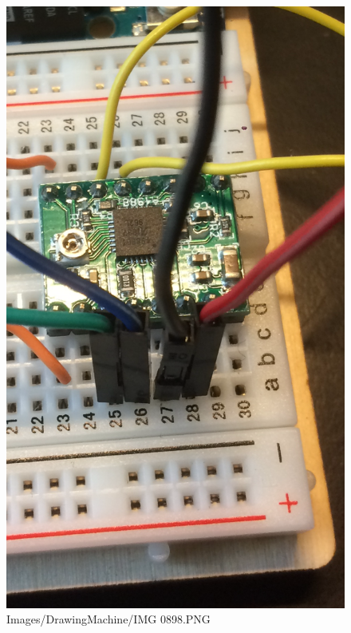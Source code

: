 \begin{figure}[H]
\includegraphics[width=\textwidth]{Images/DrawingMachine/IMG_0898.PNG}
\caption{Images/DrawingMachine/IMG 0898.PNG}
\label{fig:Images/DrawingMachine/IMG 0898.PNG}
\end{figure}

